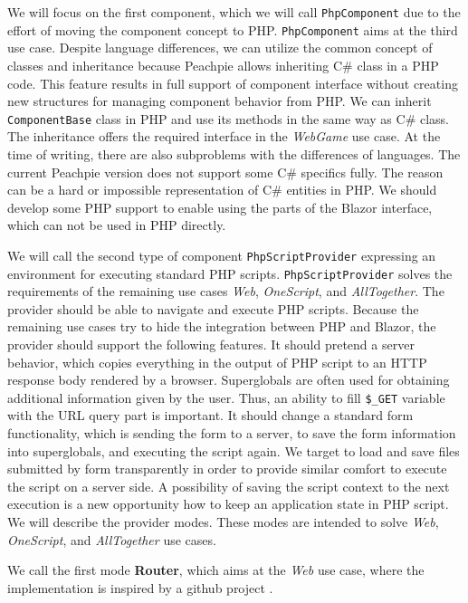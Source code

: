 \par
We will focus on the first component, which we will call \texttt{PhpComponent} due to the effort of moving the component concept to PHP.
\texttt{PhpComponent} aims at the third use case.
Despite language differences, we can utilize the common concept of classes and inheritance because Peachpie allows inheriting C\# class in a PHP code.
This feature results in full support of component interface without creating new structures for managing component behavior from PHP.
We can inherit \texttt{ComponentBase} class in PHP and use its methods in the same way as C\# class.
The inheritance offers the required interface in the \textit{WebGame} use case.
At the time of writing, there are also subproblems with the differences of languages.
The current Peachpie version does not support some C\# specifics fully.
The reason can be a hard or impossible representation of C\# entities in PHP.
We should develop some PHP support to enable using the parts of the Blazor interface, which can not be used in PHP directly.
\par
We will call the second type of component \texttt{PhpScriptProvider} expressing an environment for executing standard PHP scripts.
\texttt{PhpScriptProvider} solves the requirements of the remaining use cases \textit{Web}, \textit{OneScript}, and \textit{AllTogether}.
The provider should be able to navigate and execute PHP scripts.
Because the remaining use cases try to hide the integration between PHP and Blazor, the provider should support the following features.
It should pretend a server behavior, which copies everything in the output of PHP script to an HTTP response body rendered by a browser.
Superglobals are often used for obtaining additional information given by the user.
Thus, an ability to fill \texttt{\$\_GET} variable with the URL query part is important.
It should change a standard form functionality, which is sending the form to a server, to save the form information into superglobals, and executing the script again.
We target to load and save files submitted by form transparently in order to provide similar comfort to execute the script on a server side.
A possibility of saving the script context to the next execution is a new opportunity how to keep an application state in PHP script.
We will describe the provider modes.
These modes are intended to solve \textit{Web}, \textit{OneScript}, and \textit{AllTogether} use cases. 
\par
We call the first mode \textbf{Router}, which aims at the \textit{Web} use case, where the implementation is inspired by a github project .
